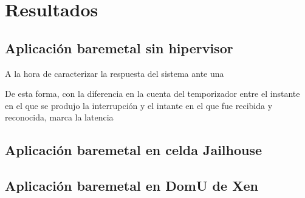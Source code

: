 \chapter{Resultados}

\section{Aplicación baremetal sin hipervisor}
A la hora de caracterizar la respuesta del sistema ante una

De esta forma, con la diferencia en la cuenta del temporizador entre el instante en el que se produjo la interrupción y el intante en el que fue recibida y reconocida, marca la latencia

\section{Aplicación baremetal en celda Jailhouse}

\section{Aplicación baremetal en DomU de Xen}

